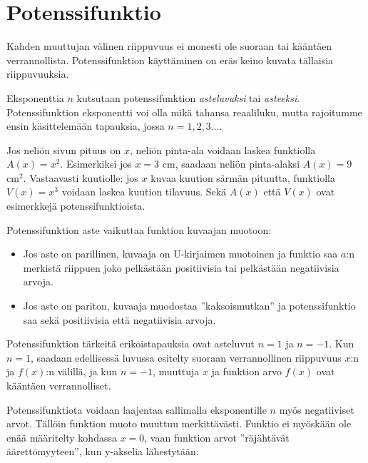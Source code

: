 \chapter{Potenssifunktio}

Kahden muuttujan välinen riippuvuus ei monesti ole suoraan
tai kääntäen verrannollista. Potenssifunktion käyttäminen on eräs
keino kuvata tällaisia riippuvuuksia.


Eksponenttia $n$ kutsutaan potenssifunktion \emph{asteluvuksi}
tai \emph{asteeksi}.
Potenssifunktion eksponentti voi olla mikä tahansa reaaliluku, mutta
rajoitumme ensin käsittelemään tapauksia, jossa $n = 1, 2, 3\ldots $.

\begin{esimerkki}
Jos neliön sivun pituus on $x$, neliön pinta-ala voidaan laskea
funktiolla $A(x)=x^2$.
Esimerkiksi jos $x = 3$ cm, saadaan neliön pinta-alaksi $A(x) = 9$ cm$^2$.
Vastaavasti kuutiolle: jos $x$ kuvaa kuution särmän pituutta, funktiolla
$V(x)=x^3$ voidaan laskea kuution tilavuus. Sekä $A(x)$ että $V(x)$ ovat
esimerkkejä potenssifunktioista.
\end{esimerkki}

Potenssifunktion aste vaikuttaa funktion kuvaajan muotoon:
\begin{itemize}
  \item
Jos aste on parillinen, kuvaaja on U-kirjaimen muotoinen ja funktio
saa $a$:n merkistä riippuen joko pelkästään positiivisia tai pelkästään
negatiivisia arvoja.
  \item
Jos aste on pariton, kuvaaja muodostaa ''kaksoismutkan'' ja potenssifunktio
saa sekä positiivisia että negatiivisia arvoja.
\end{itemize}


Potenssifunktion tärkeitä erikoistapauksia ovat asteluvut $n = 1$ ja $n = -1$.
Kun $n = 1$, saadaan edellisessä luvussa esitelty suoraan verrannollinen
riippuvuus $x$:n ja $f(x)$:n välillä, ja kun $n = -1$, muuttuja $x$ ja
funktion arvo $f(x)$ ovat kääntäen verrannolliset.

Potenssifunktiota voidaan laajentaa sallimalla eksponentille $n$
myös negatiiviset arvot.
Tällöin funktion muoto muuttuu merkittävästi. Funktio ei myöskään ole
enää määritelty kohdassa $x = 0$, vaan funktion arvot
''räjähtävät äärettömyyteen'', kun y-akselia lähestytään:

